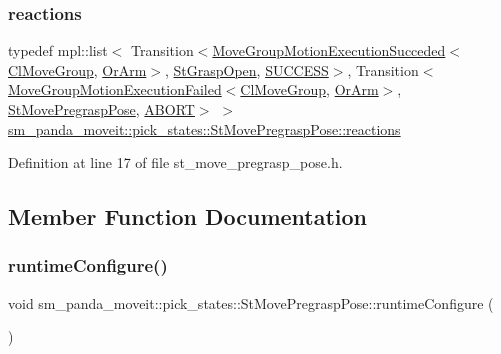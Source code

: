 \subsubsection{\texorpdfstring{reactions}{reactions}}
{\footnotesize\ttfamily typedef mpl\+::list$<$ Transition$<$\hyperlink{structmoveit__z__client_1_1MoveGroupMotionExecutionSucceded}{Move\+Group\+Motion\+Execution\+Succeded}$<$\hyperlink{classmoveit__z__client_1_1ClMoveGroup}{Cl\+Move\+Group}, \hyperlink{classsm__panda__moveit_1_1OrArm}{Or\+Arm}$>$, \hyperlink{structsm__panda__moveit_1_1pick__states_1_1StGraspOpen}{St\+Grasp\+Open}, \hyperlink{classSUCCESS}{S\+U\+C\+C\+E\+SS}$>$, Transition$<$\hyperlink{structmoveit__z__client_1_1MoveGroupMotionExecutionFailed}{Move\+Group\+Motion\+Execution\+Failed}$<$\hyperlink{classmoveit__z__client_1_1ClMoveGroup}{Cl\+Move\+Group}, \hyperlink{classsm__panda__moveit_1_1OrArm}{Or\+Arm}$>$, \hyperlink{structsm__panda__moveit_1_1pick__states_1_1StMovePregraspPose}{St\+Move\+Pregrasp\+Pose}, \hyperlink{classABORT}{A\+B\+O\+RT}$>$ $>$ \hyperlink{structsm__panda__moveit_1_1pick__states_1_1StMovePregraspPose_a1189a52a5e39d3ca3db3e754597068a7}{sm\+\_\+panda\+\_\+moveit\+::pick\+\_\+states\+::\+St\+Move\+Pregrasp\+Pose\+::reactions}}



Definition at line 17 of file st\+\_\+move\+\_\+pregrasp\+\_\+pose.\+h.



\subsection{Member Function Documentation}
\mbox{\label{structsm__panda__moveit_1_1pick__states_1_1StMovePregraspPose_a86eeebab43891031e12c917e513e1ee9}} 
\subsubsection{\texorpdfstring{runtime\+Configure()}{runtimeConfigure()}}
{\footnotesize\ttfamily void sm\+\_\+panda\+\_\+moveit\+::pick\+\_\+states\+::\+St\+Move\+Pregrasp\+Pose\+::runtime\+Configure (\begin{DoxyParamCaption}{ }\end{DoxyParamCaption})\hspace{0.3cm}{\ttfamily [inline]}}



